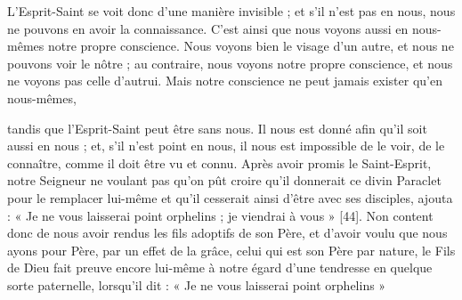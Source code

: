 L’Esprit-Saint se voit donc d’une manière invisible ; et s’il n’est pas en nous, nous ne pouvons en avoir la connaissance. C’est ainsi que nous voyons aussi en nous-mêmes notre propre conscience. Nous voyons bien le visage d’un autre, et nous ne pouvons voir le nôtre ; au contraire, nous voyons notre propre conscience, et nous ne voyons pas celle d’autrui. Mais notre conscience ne peut jamais exister qu’en nous-mêmes,~

tandis que l’Esprit-Saint peut être sans nous. Il nous est donné afin qu’il soit aussi en nous ; et, s’il n’est point en nous, il nous est impossible de le voir, de le connaître, comme il doit être vu et connu. Après avoir promis le Saint-Esprit, notre Seigneur ne voulant pas qu’on pût croire qu’il donnerait ce divin Paraclet pour le remplacer lui-même et qu’il cesserait ainsi d’être avec ses disciples, ajouta : « Je ne vous laisserai point orphelins ; je viendrai à vous » [44]. Non content donc de nous avoir rendus les fils adoptifs de son Père, et d’avoir voulu que nous ayons pour Père, par un effet de la grâce, celui qui est son Père par nature, le Fils de Dieu fait preuve encore lui-même à notre égard d’une tendresse en quelque sorte paternelle, lorsqu’il dit : « Je ne vous laisserai point orphelins »